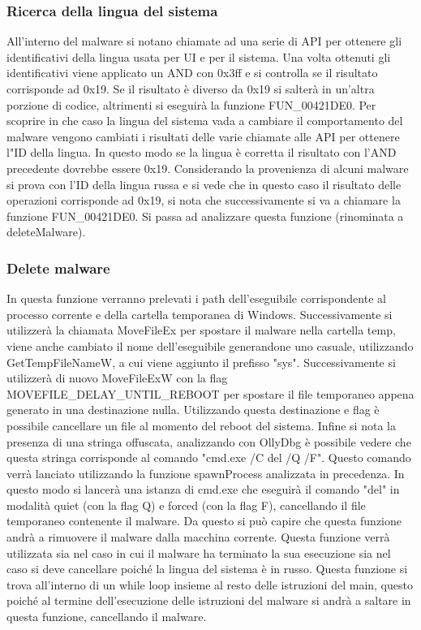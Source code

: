 \documentclass[a4paper,12pt]{article}
\begin{document}
\subsubsection{Ricerca della lingua del sistema}
All'interno del malware si notano chiamate ad una serie di API per ottenere gli identificativi della lingua usata per UI e per il sistema. Una volta ottenuti gli identificativi viene applicato un AND con 0x3ff e si controlla se il risultato corrisponde ad 0x19. Se il risultato è diverso da 0x19 si salterà in un'altra porzione di codice, altrimenti si eseguirà la funzione FUN\_00421DE0.
Per scoprire in che caso la lingua del sistema vada a cambiare il comportamento del malware vengono cambiati i risultati delle varie chiamate alle API per ottenere l"ID della lingua. In questo modo se la lingua è corretta il risultato con l'AND precedente dovrebbe essere 0x19.  
Considerando la provenienza di alcuni malware si prova con l'ID della lingua russa e si vede che in questo caso il risultato delle operazioni corrisponde ad 0x19, si nota che successivamente si va a chiamare la funzione FUN\_00421DE0. Si passa ad analizzare questa funzione (rinominata a deleteMalware). 

\subsubsection{Delete malware}
In questa funzione verranno prelevati i path dell'eseguibile corrispondente al processo corrente e della cartella temporanea di Windows. Successivamente si utilizzerà la chiamata MoveFileEx per spostare il malware nella cartella temp, viene anche cambiato il nome dell'eseguibile generandone uno casuale, utilizzando GetTempFileNameW, a cui viene aggiunto il prefisso "sys".  Successivamente si utilizzerà di nuovo MoveFileExW con la flag MOVEFILE\_DELAY\_UNTIL\_REBOOT per spostare il file temporaneo appena generato in una destinazione nulla. Utilizzando questa destinazione e flag è possibile cancellare un file al momento del reboot del sistema. 
Infine si nota la presenza di una stringa offuscata, analizzando con OllyDbg è possibile vedere che questa stringa corrisponde al comando "cmd.exe /C del /Q /F". Questo comando verrà lanciato utilizzando la funzione spawnProcess analizzata in precedenza. In questo modo si lancerà una istanza di cmd.exe che eseguirà il comando "del" in modalità quiet (con la flag Q) e forced (con la flag F), cancellando il file temporaneo contenente il malware. Da questo si può capire che questa funzione andrà a rimuovere il malware dalla macchina corrente. Questa funzione verrà utilizzata sia nel caso in cui il malware ha terminato la sua esecuzione sia nel caso si deve cancellare poiché la lingua del sistema è in russo.  Questa funzione si trova all'interno di un while loop insieme al resto delle istruzioni del main, questo poiché al termine dell'esecuzione delle istruzioni del malware si andrà a saltare in questa funzione, cancellando il malware. 
\end{document}
